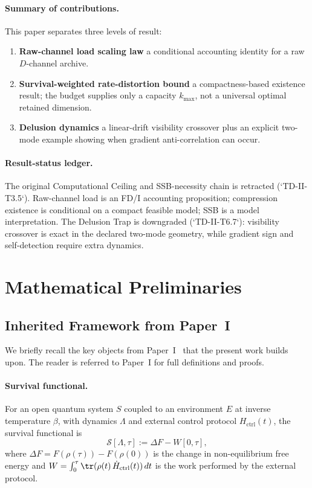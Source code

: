 \documentclass[12pt,a4paper,openany]{book}
\begin{document}
\paragraph{Summary of contributions.}
This paper separates three levels of result:
\begin{enumerate}
\item \textbf{Raw-channel load scaling law}
  a conditional accounting identity for a raw $D$-channel archive.
\item \textbf{Survival-weighted rate-distortion bound}
  a compactness-based existence result; the budget supplies only a
  capacity $k_{\max}$, not a universal optimal retained dimension.
\item \textbf{Delusion dynamics}
  a linear-drift visibility crossover plus an explicit two-mode
  example showing when gradient anti-correlation can occur.
\end{enumerate}

\paragraph{Result-status ledger.}
The original Computational Ceiling and SSB-necessity chain is retracted
(`TD-II-T3.5`).  Raw-channel load is an FD/I accounting proposition;
compression existence is conditional on a compact feasible model; SSB
is a model interpretation.  The Delusion Trap is downgraded
(`TD-II-T6.7`): visibility crossover is exact in the declared two-mode
geometry, while gradient sign and self-detection require extra dynamics.

\section{Mathematical Preliminaries}
\label{T-II-sec:prelim}

\subsection{Inherited Framework from Paper~I}
\label{T-II-subsec:inherited}

We briefly recall the key objects from
Paper~I~\cite{Liu2026TDOME_I} that the present work builds
upon.  The reader is referred to Paper~I for full definitions
and proofs.

\paragraph{Survival functional.}
For an open quantum system $S$ coupled to an environment $E$
at inverse temperature $\beta$, with dynamics $\Lambda$ and
external control protocol $H_{\mathrm{ctrl}}(t)$, the
survival functional is
\begin{equation}
\label{T-II-eq:survival_recall}
\mathcal{S}[\Lambda, \tau]
:= \Delta F - W[0,\tau],
\end{equation}
where $\Delta F = F(\rho(\tau)) - F(\rho(0))$ is the change
in non-equilibrium free energy and
$W = \int_0^\tau \tr(\rho(t)\,\dot{H}_{\mathrm{ctrl}}(t))\,dt$
is the work performed by the external protocol.
\end{document}
